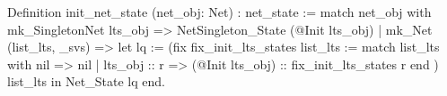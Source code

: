 Definition init_net_state (net_obj: Net) : net_state :=
  match net_obj with
    mk_SingletonNet lts_obj => NetSingleton_State (@Init lts_obj)
  | mk_Net (list_lts, _svs)  => 
      let lq := (fix fix_init_lts_states list_lts :=
          match list_lts with
            nil          => nil
          | lts_obj :: r => (@Init lts_obj) :: fix_init_lts_states r
          end
      ) list_lts in Net_State lq
  end.